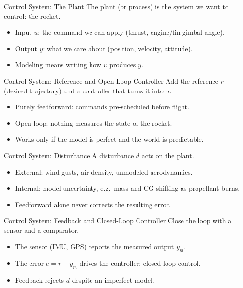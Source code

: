 \documentclass[12pt, aspectratio=169]{beamer}
\begin{document}
\begin{frame}{Control System: The Plant}
    \loopPlant[0.95]
    \vspace{0.5em}
    The \alert{plant} (or \alert{process}) is the system we want to control: the rocket.
    \begin{itemize}
        \item Input $u$: the command we can apply (thrust, engine/fin gimbal angle).
        \item Output $y$: what we care about (position, velocity, attitude).
        \item Modeling means writing how $u$ produces $y$.
    \end{itemize}
\end{frame}

\begin{frame}{Control System: Reference and Open-Loop Controller}
    \loopFeedforward[0.82]
    \vspace{0.5em}
    Add the \alert{reference} $r$ (desired trajectory) and a \alert{controller} that
    turns it into $u$.
    \begin{itemize}
        \item Purely \alert{feedforward}: commands pre-scheduled before flight.
        \item \alert{Open-loop}: nothing measures the state of the rocket. 
        \item Works only if the model is perfect and the world is predictable.
    \end{itemize}
\end{frame}

\begin{frame}{Control System: Disturbance}
    \loopDisturbance[0.75]
    \vspace{0.5em}
    A \alert{disturbance} $d$ acts on the plant.
    \begin{itemize}
        \item External: wind gusts, air density, unmodeled aerodynamics.
        \item Internal: model uncertainty, e.g.\ mass and CG shifting as propellant burns.
        \item Feedforward alone never corrects the resulting error.
    \end{itemize}
\end{frame}

\begin{frame}{Control System: Feedback and Closed-Loop Controller}
    \loopFeedback[0.70]
    \vspace{0.3em}
    Close the loop with a \alert{sensor} and a \alert{comparator}.
    \begin{itemize}
        \item The sensor (IMU, GPS) reports the measured output $y_m$.
        \item The error $e = r - y_m$ drives the controller: \alert{closed-loop} control.
        \item Feedback rejects $d$ despite an imperfect model.
    \end{itemize}
\end{frame}
\end{document}
